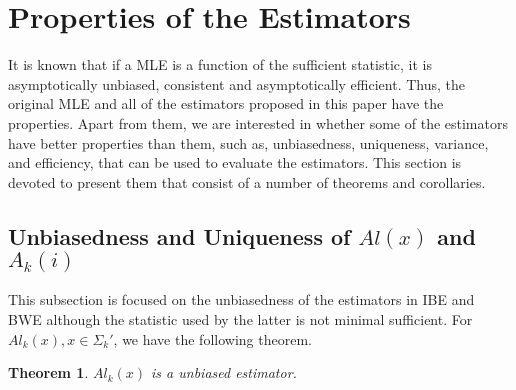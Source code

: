 \documentclass[10pt,onecolumn]{IEEEtran}
\newtheorem{theorem}{\bf Theorem}
\begin{document}
\section{Properties of the Estimators} \label{section5}

 It is known that if a MLE is a function of the sufficient statistic, it is asymptotically unbiased, consistent and asymptotically efficient. Thus, the original MLE and
all of the estimators proposed in this paper have the properties. Apart from them, we are interested in whether some of the estimators have better properties
 than them, such as, unbiasedness, uniqueness, variance, and efficiency, that can be used to evaluate the estimators. This section is devoted to present them that consist of a number of  theorems and corollaries.

\subsection{Unbiasedness and Uniqueness of $Al(x)$ and $A_k(i)$}
This subsection is focused on the unbiasedness of the estimators in IBE and BWE although the statistic used by the latter is not minimal sufficient. For $Al_k(x), x \in \Sigma_k'$, we have the following theorem.

 \begin{theorem} \label{local maximum}
$Al_k(x)$ is a unbiased estimator.
\end{theorem}
\end{document}
